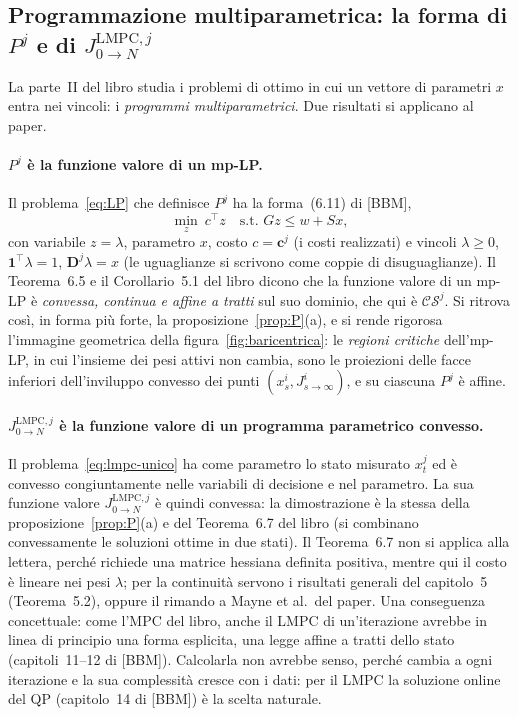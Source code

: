 \documentclass[11pt,a4paper]{article}
\theoremstyle{definition}
\theoremstyle{plain}
\theoremstyle{remark}
\newcommand{\CS}{\mathcal{CS}}
\newcommand{\JL}{J^{\mathrm{LMPC},j}_{0\to N}}
\newcommand{\vett}[1]{\mathbf{#1}}
\begin{document}
\subsection{Programmazione multiparametrica: la forma di $P^j$ e di $\JL$}\label{sec:libro-mp}

La parte~II del libro studia i problemi di ottimo in cui un vettore di
parametri $x$ entra nei vincoli: i \emph{programmi multiparametrici}. Due
risultati si applicano al paper.

\paragraph{$P^j$ è la funzione valore di un mp-LP.}
Il problema~\eqref{eq:LP} che definisce $P^j$ ha la forma~(6.11) di [BBM],
\[
  \min_z\ c^\top z\quad\text{s.t. } Gz\le w+Sx,
\]
con variabile $z=\lambda$, parametro $x$, costo $c=\vett{c}^j$ (i costi
realizzati) e vincoli $\lambda\ge 0$, $\vett{1}^\top\lambda=1$,
$\vett{D}^j\lambda=x$ (le uguaglianze si scrivono come coppie di
disuguaglianze). Il Teorema~6.5 e il Corollario~5.1 del libro dicono che la
funzione valore di un mp-LP è \emph{convessa, continua e affine a tratti} sul
suo dominio, che qui è $\CS^j$. Si ritrova così, in forma più forte, la
proposizione~\ref{prop:P}(a), e si rende rigorosa l'immagine geometrica della
figura~\ref{fig:baricentrica}: le \emph{regioni critiche} dell'mp-LP, in cui
l'insieme dei pesi attivi non cambia, sono le proiezioni delle facce
inferiori dell'inviluppo convesso dei punti $(x^i_s,J^i_{s\to\infty})$, e su
ciascuna $P^j$ è affine.

\paragraph{$\JL$ è la funzione valore di un programma parametrico convesso.}
Il problema~\eqref{eq:lmpc-unico} ha come parametro lo stato misurato
$x^j_t$ ed è convesso congiuntamente nelle variabili di decisione e nel
parametro. La sua funzione valore $\JL$ è quindi convessa: la dimostrazione
è la stessa della proposizione~\ref{prop:P}(a) e del Teorema~6.7 del libro
(si combinano convessamente le soluzioni ottime in due stati). Il Teorema~6.7
non si applica alla lettera, perché richiede una matrice hessiana definita
positiva, mentre qui il costo è lineare nei pesi $\lambda$; per la continuità
servono i risultati generali del capitolo~5 (Teorema~5.2), oppure il rimando a
Mayne et al.\ del paper. Una conseguenza concettuale: come l'MPC del libro, anche
il LMPC di un'iterazione avrebbe in linea di principio una forma esplicita,
una legge affine a tratti dello stato (capitoli~11--12 di [BBM]). Calcolarla
non avrebbe senso, perché cambia a ogni iterazione e la sua complessità cresce
con i dati: per il LMPC la soluzione online del QP (capitolo~14 di [BBM]) è la
scelta naturale.
\end{document}
